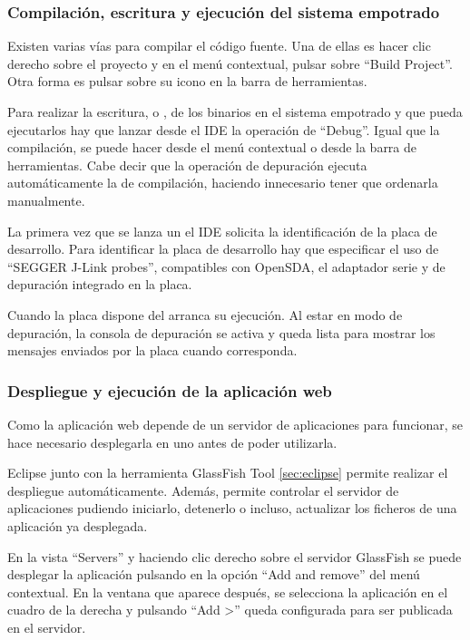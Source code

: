 \subsubsection{Compilación, escritura y ejecución del sistema empotrado}
\label{sec:exe-se}
Existen varias vías para compilar el código fuente. Una de ellas es hacer clic
derecho sobre el proyecto y en el menú contextual, pulsar sobre ``Build
Project''. Otra forma es pulsar sobre su icono en la barra de herramientas.

Para realizar la escritura, o , de los binarios en el
sistema empotrado y que pueda ejecutarlos hay que lanzar desde el IDE la
operación de ``Debug''. Igual que la compilación, se puede hacer desde el menú
contextual o desde la barra de herramientas. Cabe decir que la operación de
depuración ejecuta automáticamente la de compilación, haciendo innecesario tener
que ordenarla manualmente.

La primera vez que se lanza un  el IDE solicita la
identificación de la placa de desarrollo. Para identificar la placa de
desarrollo hay que especificar el uso de ``SEGGER J-Link probes'', 
compatibles con OpenSDA, el adaptador serie y de depuración integrado en la
placa. 



Cuando la placa dispone del \sw{} arranca su ejecución. Al estar en modo de
depuración, la consola de depuración se activa y queda lista para mostrar los
mensajes enviados por la placa cuando corresponda.



\subsubsection{Despliegue y ejecución de la aplicación web} \label{sec:exe-aw}
Como la aplicación web depende de un servidor de aplicaciones para funcionar,
se hace necesario desplegarla en uno antes de poder utilizarla.

Eclipse junto con la herramienta GlassFish Tool \ref{sec:eclipse} permite
realizar el despliegue automáticamente. Además, permite controlar el servidor
de aplicaciones pudiendo iniciarlo, detenerlo o incluso, actualizar los
ficheros de una aplicación ya desplegada.

En la vista ``Servers'' y haciendo clic derecho sobre el servidor GlassFish
se puede desplegar la aplicación pulsando en la opción ``Add and remove'' del
menú contextual. En la ventana que aparece después, se selecciona la aplicación
en el cuadro de la derecha y pulsando ``Add >'' queda configurada para ser
publicada en el servidor.

